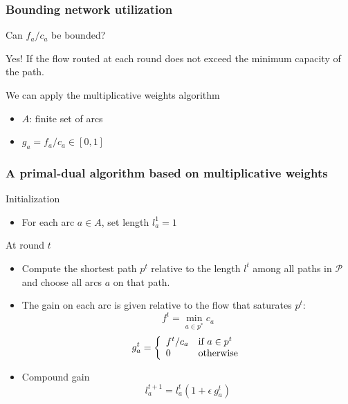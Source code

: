 \documentclass{beamer}
\begin{document}
\begin{frame}
    \frametitle{Bounding network utilization}

    Can $f_a / c_a$ be bounded?
    \begin{block}{Yes!}
        If the flow routed at each round does not exceed the minimum capacity
        of the path.
    \end{block}

    \begin{block}{We can apply the multiplicative weights algorithm}
        \begin{itemize}
            \item $A$: finite set of arcs
            \item $g_a = f_a / c_a \in [0,1]$
        \end{itemize}
    \end{block}

\end{frame}

\begin{frame}
    \frametitle{A primal-dual algorithm based on multiplicative weights}

    \begin{block}{Initialization}
        \begin{itemize} \item
            For each arc $a\in A$, set length $l_a^1 = 1$
        \end{itemize}
    \end{block}
    \begin{block}{At round $t$}
        \begin{itemize}
        \item Compute the shortest path $p^t$ relative to the length $l^t$
            among all paths in $\mathcal{P}$ and choose all arcs $a$ on that
            path.
        \item The gain on each arc is given relative to the flow that saturates
             $p^t$: 
            \begin{equation*}
            f^t = \min_{a\in p^*} c_a
            \end{equation*}
            \begin{equation*}
                g_a^t = \left\{
        \begin{array}{l l}
        f^t/c_a & \text{if $a \in p^t$}\\
        0 & \text{otherwise}
        \end{array}
        \right.
            \end{equation*}
            
        \item Compound gain
            \begin{equation*}
            l_a^{t+1} = l_a^t (1 + \epsilon~g_a^t)
            \end{equation*}
        \end{itemize}
    \end{block}

\end{frame}
\end{document}
